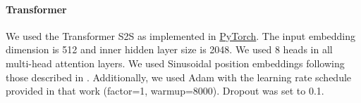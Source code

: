 \paragraph{Transformer}
We used the Transformer S2S as implemented in
\href{https://pytorch.org/}{PyTorch}.
The input embedding dimension is 512 and inner hidden layer size is 2048.
We used 8 heads in all multi-head attention layers.
We used Sinusoidal position embeddings following those described in
\citet{rush2018annotated}. Additionally, we used Adam with the learning
rate schedule provided in that work (factor=1, warmup=8000).
Dropout was set to 0.1.


\newcommand{\utt}{\ensuremath{\mathbf{y}}}
\newcommand{\uttVocab}{\ensuremath{\mathcal{W}}}
\newcommand{\da}{\ensuremath{a}}
\newcommand{\inseq}{\mathbf{x}}
\newcommand{\Attrs}{\ensuremath{\mathcal{V}}}
\newcommand{\inSize}{m}
\newcommand{\outSize}{n}

\newcommand{\mmhAttn}{\operatorname{maskedMHAttn}}
\newcommand{\mhAttn}{\operatorname{MHAttn}}

\newcommand{\mrEmb}{\mathbf{W}}
\newcommand{\uttEmb}{\mathbf{V}}
\newcommand{\decInput}{\mathbf{G}}
\newcommand{\decInputi}{\mathbf{g}_i}


\newcommand{\tfeA}{\boldsymbol{\check{\encInput}}^{(i)}}
\newcommand{\tfeB}{\boldsymbol{\bar{\encInput}}^{(i)}}
\newcommand{\tfeC}{\boldsymbol{\hat{\encInput}}^{(i)}}
\newcommand{\tfeD}{\boldsymbol{\dot{\encInput}}^{(i)}}
\newcommand{\tfeE}{\boldsymbol{\ddot{\encInput}}^{(i)}}

\newcommand{\tfdA}{\boldsymbol{\check{\decInput}}^{(i)}}
\newcommand{\tfdB}{\boldsymbol{\bar{\decInput}}^{(i)}}
\newcommand{\tfdC}{\boldsymbol{\hat{\decInput}}^{(i)}}
\newcommand{\tfdD}{\boldsymbol{\grave{\decInput}}^{(i)}}
\newcommand{\tfdE}{\boldsymbol{\tilde{\decInput}}^{(i)}}
\newcommand{\tfdF}{\boldsymbol{\acute{\decInput}}^{(i)}}
\newcommand{\tfdG}{\boldsymbol{\dot{\decInput}}^{(i)}}
\newcommand{\tfdH}{\boldsymbol{\ddot{\decInput}}^{(i)}}


